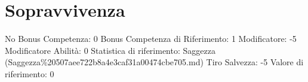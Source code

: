 \section{Sopravvivenza}\label{sopravvivenza}

\begin{description}
\tightlist
\item[Tags: ABI]
No Bonus Competenza: 0 Bonus Competenza di Riferimento: 1 Modificatore:
-5 Modificatore Abilità: 0 Statistica di riferimento: Saggezza
(Saggezza\%20507aee722b8a4e3caf31a00474cbe705.md) Tiro Salvezza: -5
Valore di riferimento: 0
\end{description}
